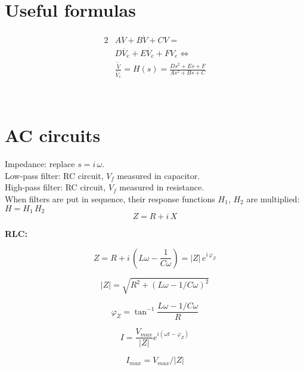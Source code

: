 \documentclass{form}
\begin{document}
\begin{minipage}[c]{0.24\textwidth}
	\section*{Useful formulas} \vspace*{-1em}
	\begin{alignat*}{2}
		&A\ddot{V}+B\dot{V}+CV=\\
		&D\ddot{V_e}+E\dot{V_e}+FV_e \iff \\
		&\frac{\tilde{V}}{\tilde{V_e}}=H(s)=\frac{Ds^2+Es+F}{As^2+Bs+C}		
	\end{alignat*}
\end{minipage}\\
\begin{minipage}[c]{0.43\textwidth}
	\section*{AC circuits}
	Impedance: replace $s=i\,\omega$.\\
	Low-pass filter: RC circuit, $V_f$ measured in capacitor.\\
	High-pass filter: RC circuit, $V_f$ measured in resistance.\\
	When filters are put in sequence, their response functions $H_1$, $H_2$ are multiplied: $H=H_1\,H_2$
	\begin{equation*}
		Z=R+i\,X
	\end{equation*}
\end{minipage}%
\begin{minipage}[c]{0.55\textwidth}
	\textbf{RLC:}\\
	\begin{minipage}[c]{0.53\textwidth}
		\begin{equation*}
			Z =R+i\,\left(L\omega-\frac{1}{C\omega}\right)=|Z|\,e^{i\,\varphi_Z}
		\end{equation*}
	\end{minipage}
	\begin{minipage}[c]{0.43\textwidth}
		\begin{equation*}
			|Z|=\sqrt{R^2+(L\omega-1/C\omega)^2} 
		\end{equation*}
	\end{minipage}
	\begin{minipage}[c]{0.37\textwidth}
		\begin{equation*}
			\varphi_Z =\tan^{-1}\frac{L\omega-1/C\omega}{R}
		\end{equation*}
	\end{minipage}
	\begin{minipage}[c]{0.32\textwidth}
		\begin{equation*}
			I    = \frac{V_{max}}{|Z|}e^{i(\omega t - \varphi_Z)}
		\end{equation*}
	\end{minipage}
	\begin{minipage}[c]{0.27\textwidth}
		\begin{equation*}
			I_{max} = V_{max}/|Z|
		\end{equation*}
	\end{minipage}
\end{minipage}\\
\end{document}

